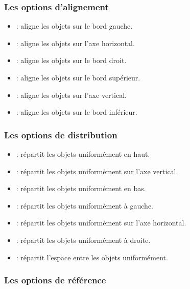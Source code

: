 \subsubsection{Les options d'alignement}

\begin{itemize}
    \item {} : aligne les objets sur le bord gauche.
    \item {} : aligne les objets sur l'axe horizontal.
    \item {} : aligne les objets sur le bord droit.
    \item {} : aligne les objets sur le bord supérieur.
    \item {} : aligne les objets sur l'axe vertical.
    \item {} : aligne les objets sur le bord inférieur.
\end{itemize}

\subsubsection{Les options de distribution}

\begin{itemize}
    \item {} : répartit les objets uniformément en haut.
    \item {} : répartit les objets uniformément sur l'axe vertical.
    \item {} : répartit les objets uniformément en bas.
    \item {} : répartit les objets uniformément à gauche.
    \item {} : répartit les objets uniformément sur l'axe horizontal.
    \item {} : répartit les objets uniformément à droite.
    \item {} : répartit l'espace entre les objets uniformément.
\end{itemize}

\subsubsection{Les options de référence}

